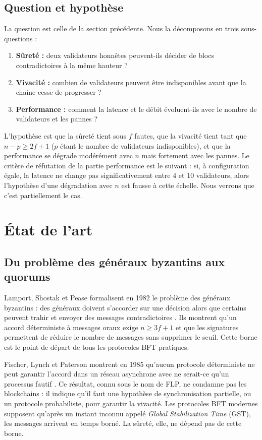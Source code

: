 \documentclass[conference]{IEEEtran}
\begin{document}
\subsection{Question et hypothèse}

La question est celle de la section précédente. Nous la décomposons en trois sous-questions :

\begin{enumerate}
\item \textbf{Sûreté :} deux validateurs honnêtes peuvent-ils décider de blocs contradictoires à la même hauteur ?
\item \textbf{Vivacité :} combien de validateurs peuvent être indisponibles avant que la chaîne cesse de progresser ?
\item \textbf{Performance :} comment la latence et le débit évoluent-ils avec le nombre de validateurs et les pannes ?
\end{enumerate}

L'hypothèse est que la sûreté tient sous $f$ fautes, que la vivacité tient tant que $n-p \geq 2f+1$ ($p$ étant le nombre de validateurs indisponibles), et que la performance se dégrade modérément avec $n$ mais fortement avec les pannes. Le critère de réfutation de la partie performance est le suivant : si, à configuration égale, la latence ne change pas significativement entre 4 et 10 validateurs, alors l'hypothèse d'une dégradation avec $n$ est fausse à cette échelle. Nous verrons que c'est partiellement le cas.

\section{État de l'art}
\label{sec:etat}

\subsection{Du problème des généraux byzantins aux quorums}

Lamport, Shostak et Pease formalisent en 1982 le problème des généraux byzantins : des généraux doivent s'accorder sur une décision alors que certains peuvent trahir et envoyer des messages contradictoires \cite{lamport1982byzantine}. Ils montrent qu'un accord déterministe à messages oraux exige $n \geq 3f+1$ et que les signatures permettent de réduire le nombre de messages sans supprimer le seuil. Cette borne est le point de départ de tous les protocoles BFT pratiques.

Fischer, Lynch et Paterson montrent en 1985 qu'aucun protocole déterministe ne peut garantir l'accord dans un réseau asynchrone avec ne serait-ce qu'un processus fautif \cite{fischer1985flp}. Ce résultat, connu sous le nom de FLP, ne condamne pas les blockchains : il indique qu'il faut une hypothèse de synchronisation partielle, ou un protocole probabiliste, pour garantir la vivacité. Les protocoles BFT modernes supposent qu'après un instant inconnu appelé \emph{Global Stabilization Time} (GST), les messages arrivent en temps borné. La sûreté, elle, ne dépend pas de cette borne.
\end{document}
